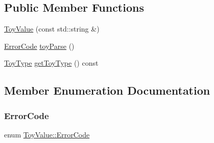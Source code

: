 \subsection*{Public Member Functions}
\begin{DoxyCompactItemize}
\item 
\hyperlink{classToyValue_afe6bb7b76eff8ffdb937a97ba21db8db}{Toy\+Value} (const std\+::string \&)
\item 
\hyperlink{classToyValue_a31b548920488141921c06e2825c6e2f1}{Error\+Code} \hyperlink{classToyValue_acd39c13bcfa9dacd70e6823f9dfedf41}{toy\+Parse} ()
\item 
\hyperlink{classToyValue_afe40e1c745e0cc296066ae27f9d7f9fb}{Toy\+Type} \hyperlink{classToyValue_aab973bc2051c7b587719c2a60ab0df9a}{get\+Toy\+Type} () const
\end{DoxyCompactItemize}


\subsection{Member Enumeration Documentation}
\mbox{\label{classToyValue_a31b548920488141921c06e2825c6e2f1}} 
\subsubsection{\texorpdfstring{Error\+Code}{ErrorCode}}
{\footnotesize\ttfamily enum \hyperlink{classToyValue_a31b548920488141921c06e2825c6e2f1}{Toy\+Value\+::\+Error\+Code}}

